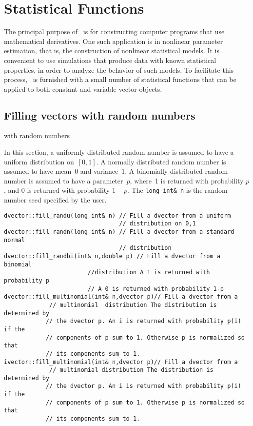 \documentclass{admbmanual}
\begin{document}

\chapter{Statistical Functions}

The principal purpose of \scAD\ is for constructing computer programs
that use mathematical derivatives. One such application
is in nonlinear parameter estimation, that is, the construction
of nonlinear statistical models. 
It is convenient to use simulations that produce 
data with known statistical properties, in order
to analyze the behavior of such models.
To facilitate this
process, \scAD\ is furnished with a small number of statistical
functions that can be applied to both constant and variable vector objects.


\section{Filling vectors with random numbers}
 {with random numbers}

In this section, a uniformly distributed random number is assumed to have
a uniform distribution on~$[0,1]$. A normally distributed random number
is assumed to have mean~$0$ and variance~$1$.
A binomially distributed random number is assumed to have a parameter~$p$,
where~1 is returned with probability $p$, and $0$ is returned with
probability $1-p$.
The \texttt{long~int\&~n} is the random number seed specified by the user.

\begin{lstlisting}
dvector::fill_randu(long int& n) // Fill a dvector from a uniform 
                                 // distribution on 0,1 
dvector::fill_randn(long int& n) // Fill a dvector from a standard normal 
                                 // distribution 
dvector::fill_randbi(int& n,double p) // Fill a dvector from a binomial 
                        //distribution A 1 is returned with probability p
                        // A 0 is returned with probability 1-p
dvector::fill_multinomial(int& n,dvector p)// Fill a dvector from a 
             // multinomial  distribution The distribution is determined by  
            // the dvector p. An i is returned with probability p(i) if the 
            // components of p sum to 1. Otherwise p is normalized so that 
            // its components sum to 1.  
ivector::fill_multinomial(int& n,dvector p)// Fill a dvector from a  
             // multinomial distribution The distribution is determined by  
            // the dvector p. An i is returned with probability p(i) if the 
            // components of p sum to 1. Otherwise p is normalized so that 
            // its components sum to 1.  
\end{lstlisting}
\end{document}
